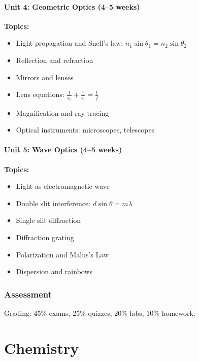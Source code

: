 \documentclass[12pt,oneside]{book}
\begin{document}
\subsection{Unit 4: Geometric Optics (4--5 weeks)}

\textbf{Topics:}
\begin{itemize}
    \item Light propagation and Snell's law: $n_1\sin\theta_1 = n_2\sin\theta_2$
    \item Reflection and refraction
    \item Mirrors and lenses
    \item Lens equations: $\frac{1}{s_o} + \frac{1}{s_i} = \frac{1}{f}$
    \item Magnification and ray tracing
    \item Optical instruments: microscopes, telescopes
\end{itemize}

\subsection{Unit 5: Wave Optics (4--5 weeks)}

\textbf{Topics:}
\begin{itemize}
    \item Light as electromagnetic wave
    \item Double slit interference: $d\sin\theta = m\lambda$
    \item Single slit diffraction
    \item Diffraction grating
    \item Polarization and Malus's Law
    \item Dispersion and rainbows
\end{itemize}

\section{Assessment}

Grading: 45\% exams, 25\% quizzes, 20\% labs, 10\% homework.


\part{Chemistry}
\end{document}
